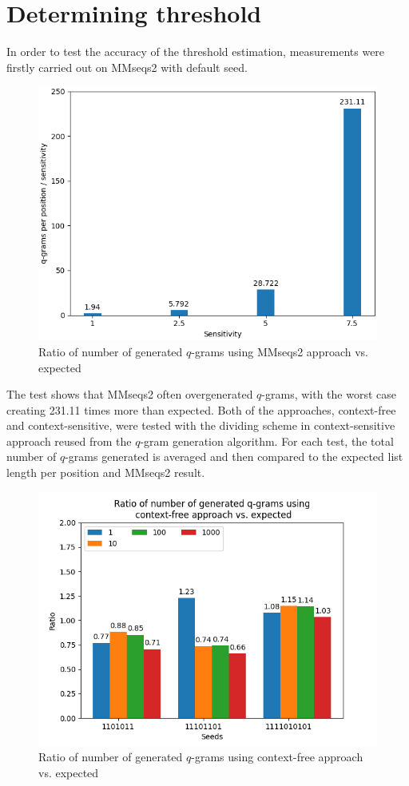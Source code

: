 \documentclass[twoside,a4paper,bsc]{master}
\newcommand{\Qgram}[1]{\(#1\)-gram}
\begin{document}
\section{Determining threshold}
In order to test the accuracy of the threshold estimation, measurements
were firstly carried out on MMseqs2 with default seed.
\begin{figure}
\centering
\includegraphics[scale=0.6]{graphics/mmseqs2_sensitivity.png}
\caption{Ratio of number of generated \Qgram{q}s using MMseqs2 approach
vs. expected}
\label{fig:mmseqssens}
\end{figure}
The test shows that MMseqs2 often overgenerated \Qgram{q}s, with the worst
case creating 231.11 times more than expected.
Both of the approaches, context-free and context-sensitive, were tested
with the
dividing scheme in context-sensitive approach reused from the \Qgram{q}
generation algorithm. For each test, the total number of \Qgram{q}s
generated is
averaged and then compared to the expected list length per position and
MMseqs2
result.
\begin{figure}
\centering
\includegraphics[scale=0.6]{graphics/threshold_contextfree.png}
\caption{Ratio of number of generated \Qgram{q}s using context-free
approach vs. expected}
\label{fig:numctxfree}
\end{figure}
\end{document}
